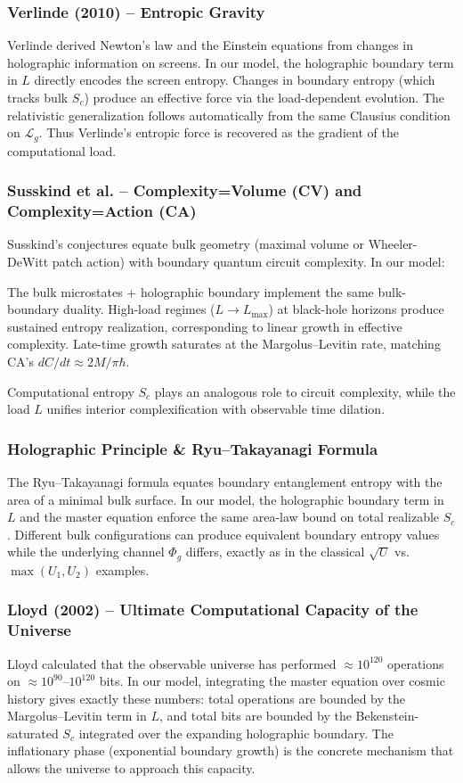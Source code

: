 \documentclass[reprint,amsmath,amssymb,aps,prd,preprintnumbers,superscriptaddress,longbibliography,10pt]{revtex4-2}
\begin{document}
\subsubsection{Verlinde (2010) -- Entropic Gravity}
Verlinde derived Newton’s law and the Einstein equations from changes in holographic information on screens.
In our model, the holographic boundary term in $  L  $ directly encodes the screen entropy. Changes in boundary entropy (which tracks bulk $  S_c  $) produce an effective force via the load-dependent evolution. The relativistic generalization follows automatically from the same Clausius condition on $  \mathcal{L}_g  $. Thus Verlinde’s entropic force is recovered as the gradient of the computational load.

\subsubsection{Susskind et al. -- Complexity=Volume (CV) and Complexity=Action (CA)}
Susskind’s conjectures equate bulk geometry (maximal volume or Wheeler-DeWitt patch action) with boundary quantum circuit complexity.
In our model:

The bulk microstates + holographic boundary implement the same bulk-boundary duality.
High-load regimes ($  L \to L_{\max}  $) at black-hole horizons produce sustained entropy realization, corresponding to linear growth in effective complexity.
Late-time growth saturates at the Margolus–Levitin rate, matching CA’s $  dC/dt \approx 2M/\pi\hbar  $.

Computational entropy $  S_c  $ plays an analogous role to circuit complexity, while the load $  L  $ unifies interior complexification with observable time dilation.


\subsubsection{Holographic Principle \& Ryu--Takayanagi Formula}
The Ryu–Takayanagi formula equates boundary entanglement entropy with the area of a minimal bulk surface.
In our model, the holographic boundary term in $  L  $ and the master equation enforce the same area-law bound on total realizable $  S_c  $. Different bulk configurations can produce equivalent boundary entropy values while the underlying channel $  \Phi_g  $ differs, exactly as in the classical $  \sqrt{U}  $ vs. $  \max(U_1,U_2)  $ examples.

\subsubsection{Lloyd (2002) -- Ultimate Computational Capacity of the Universe}
Lloyd calculated that the observable universe has performed $  \approx 10^{120}  $ operations on $  \approx 10^{90}  $–$  10^{120}  $ bits.
In our model, integrating the master equation over cosmic history gives exactly these numbers: total operations are bounded by the Margolus–Levitin term in $  L  $, and total bits are bounded by the Bekenstein-saturated $  S_c  $ integrated over the expanding holographic boundary. The inflationary phase (exponential boundary growth) is the concrete mechanism that allows the universe to approach this capacity.
\end{document}
